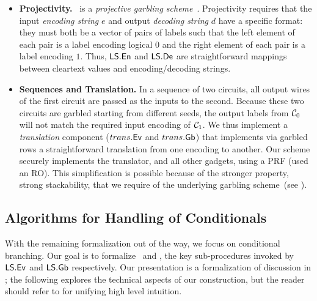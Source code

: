 \begin{itemize}
  \item \textbf{Projectivity.} \ourschemelong\
    is a \emph{projective garbling scheme}~\cite{CCS:BelHoaRog12}.
    Projectivity requires that the input \emph{encoding string}
    $e$ and output \emph{decoding string} $d$ have a specific format:
    they must both be a vector of pairs of labels such that the left
    element of each pair is a label encoding logical $0$ and the right
    element of each pair is a label encoding $1$.
    Thus, $\textsf{LS}.\textsf{En}$ and $\textsf{LS}.\textsf{De}$ are straightforward
    mappings between cleartext values and encoding/decoding strings.
  \item \textbf{Sequences and Translation.} In a sequence of two
    circuits, all output wires of the first circuit are passed as the inputs
    to the second. Because these two circuits are garbled starting
    from different seeds, the output labels from $\mathcal C_0$ will not match the required
    input encoding of $\mathcal C_1$.
    We thus implement a \emph{translation} component ($trans.\textsf{Ev}$
    and $trans.\textsf{Gb}$) that implements via garbled rows a
    straightforward translation from one encoding to another.
    Our scheme securely implements the translator, and all other
    gadgets, using a PRF (\HK used an RO).
    This simplification is possible because of the stronger
    property, strong stackability, that we require
    of the underlying garbling scheme~(see ).
\end{itemize}

\subsection{Algorithms for Handling of Conditionals}\label{sec:approach-cond}

With the remaining formalization out of the way, we focus
on conditional branching. Our goal is to formalize \evcond\
and \gbcond, the key sub-procedures invoked by $\textsf{LS}.\textsf{Ev}$ and
$\textsf{LS}.\textsf{Gb}$ respectively.
Our presentation is a formalization of discussion in
; the following explores the technical aspects
of our construction, but the reader should refer to
\Cref{sec:techOverview} for unifying high level intuition.


